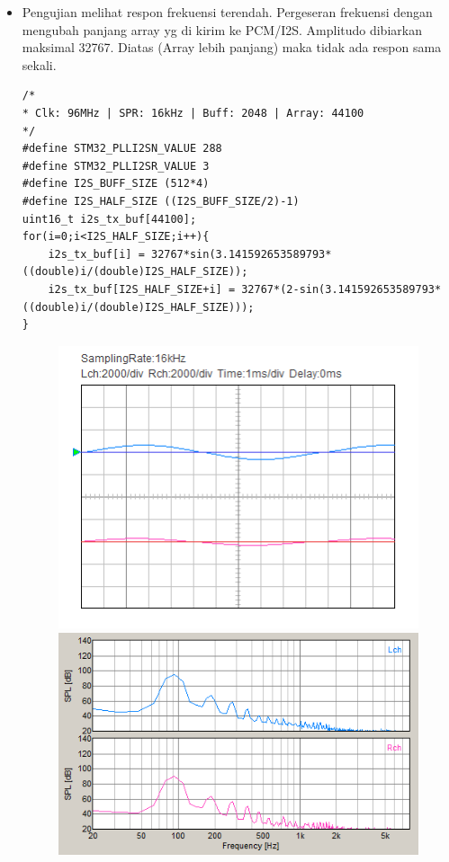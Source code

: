 \documentclass[12pt,]{article}
\begin{document}
\begin{itemize}
\begin{itemize}
		\item Pengujian melihat respon frekuensi terendah.
		Pergeseran frekuensi dengan mengubah panjang array yg di kirim ke PCM/I2S.
		Amplitudo dibiarkan maksimal 32767.
		Diatas (Array lebih panjang) maka tidak ada respon sama sekali.
		\begin{verbatim}
/*
* Clk: 96MHz | SPR: 16kHz | Buff: 2048 | Array: 44100
*/
#define STM32_PLLI2SN_VALUE 288
#define STM32_PLLI2SR_VALUE 3
#define I2S_BUFF_SIZE (512*4)
#define I2S_HALF_SIZE ((I2S_BUFF_SIZE/2)-1)
uint16_t i2s_tx_buf[44100];
for(i=0;i<I2S_HALF_SIZE;i++){
	i2s_tx_buf[i] = 32767*sin(3.141592653589793*((double)i/(double)I2S_HALF_SIZE));
	i2s_tx_buf[I2S_HALF_SIZE+i] = 32767*(2-sin(3.141592653589793*((double)i/(double)I2S_HALF_SIZE)));
}
		\end{verbatim}
		\begin{figure}[H]
			\centering
			\includegraphics[width=0.45\linewidth]{result/day_3/osi_lowest_fr}
			\includegraphics[width=0.45\linewidth]{result/day_3/fft_lowest_fr}
		\end{figure}
	

\end{itemize}
\end{itemize}
\end{document}
